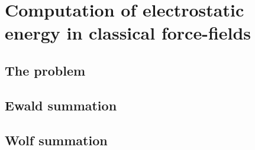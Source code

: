 \documentclass[thesis]{subfiles}
\begin{document}
\chapter{Computation of electrostatic energy in classical force-fields}

\section{The problem}

\section{Ewald summation}

\section{Wolf summation}
\end{document}
